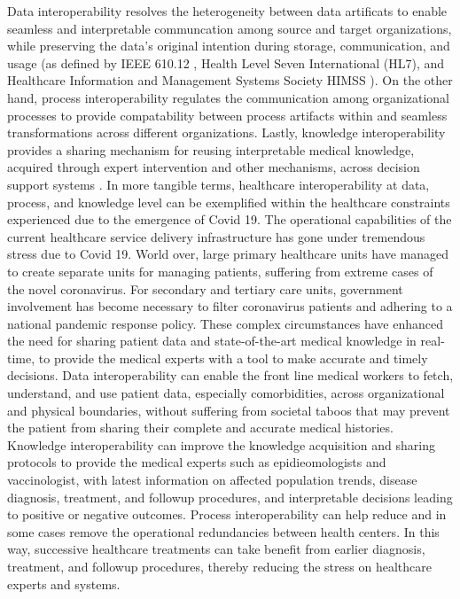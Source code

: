 \documentclass{ieeeaccess}
\begin{document}
Data interoperability resolves the heterogeneity between data artificats to enable seamless and interpretable communcation among source and target organizations, while preserving the data's original intention during storage, communication, and usage (as defined by IEEE 610.12 \cite{geraci1991ieee}, Health Level Seven International (HL7), and Healthcare Information and Management Systems Society HIMSS \cite{Himss_url2013}).
On the other hand, process interoperability regulates the communication among organizational processes to provide compatability between process artifacts within and seamless transformations across different organizations\cite{khan2013process}. Lastly, knowledge interoperability provides a sharing mechanism for reusing interpretable medical knowledge, acquired through expert intervention and other mechanisms, across decision support systems \cite{ali2017multi}.
In more tangible terms, healthcare interoperability at data, process, and knowledge level can be exemplified within the healthcare constraints experienced due to the emergence of Covid 19. The operational capabilities of the current healthcare service delivery infrastructure has gone under tremendous stress due to Covid 19. World over, large primary healthcare units have managed to create separate units for managing patients, suffering from extreme cases of the novel coronavirus. For secondary and tertiary care units, government involvement has become necessary to filter coronavirus patients and adhering to a national pandemic response policy. 
These complex circumstances have enhanced the need for sharing patient data and state-of-the-art medical knowledge in real-time, to provide the medical experts with a tool to make accurate and timely decisions.
Data interoperability can enable the front line medical workers to fetch, understand, and use patient data, especially comorbidities, across organizational and physical boundaries, without suffering from societal taboos that may prevent the patient from sharing their complete and accurate medical histories. Knowledge interoperability can improve the knowledge acquisition and sharing protocols to provide the medical experts such as epidieomologists and vaccinologist, with latest information on affected population trends, disease diagnosis, treatment, and followup procedures, and interpretable decisions leading to positive or negative outcomes. Process interoperability can help reduce and in some cases remove the operational redundancies between health centers. In this way, successive healthcare treatments can take benefit from earlier diagnosis, treatment, and followup procedures, thereby reducing the stress on healthcare experts and systems. 
\end{document}
